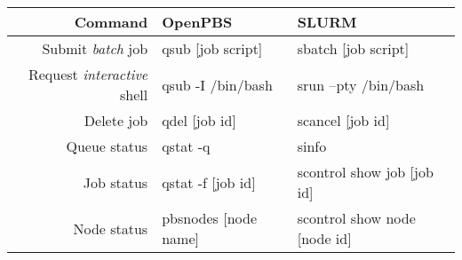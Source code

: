 \small
{\renewcommand{\arraystretch}{1.2}%
\begin{tabularx}{\textwidth}{r|X|X}
\toprule
{\bf Command} & {\bf OpenPBS} & {\bf SLURM}  \\
\midrule

Submit {\em batch} job &
qsub [job script] &
sbatch [job script]
\\ \hline

Request {\em interactive} shell &
qsub -I /bin/bash &
srun --pty /bin/bash
\\ \hline

Delete job &
qdel [job id] &
scancel [job id]
\\ \hline

Queue status &
qstat -q &
sinfo
\\ \hline

Job status &
qstat -f [job id]  &
scontrol show job [job id]
\\ \hline

Node status &
pbsnodes [node name] &
scontrol show node [node id]
\\ \hline

\bottomrule
\end{tabularx}}



